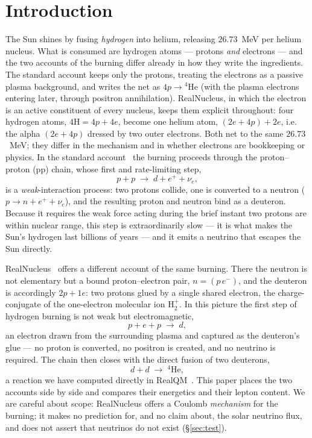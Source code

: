 \documentclass[11pt]{article}
\begin{document}

\section{Introduction}

The Sun shines by fusing \emph{hydrogen} into helium, releasing $26.73$~MeV per helium nucleus. What is
consumed are hydrogen atoms --- protons \emph{and} electrons --- and the two accounts of the burning
differ already in how they write the ingredients. The standard account keeps only the protons, treating
the electrons as a passive plasma background, and writes the net as $4p\to{}^4\mathrm{He}$ (with the
plasma electrons entering later, through positron annihilation). RealNucleus, in which the electron is
an active constituent of every nucleus, keeps them explicit throughout: four hydrogen atoms,
$4\mathrm{H}=4p+4e$, become one helium atom, $(2e+4p)+2e$, i.e. the alpha $(2e+4p)$ dressed by two outer
electrons. Both net to the same $26.73$~MeV; they differ in the mechanism and in whether electrons are
bookkeeping or physics. In the standard account~\cite{Bethe,Adelberger} the burning proceeds through the
proton--proton (pp) chain, whose first and rate-limiting step,
\begin{equation}
p + p \;\longrightarrow\; d + e^{+} + \nu_e ,
\label{eq:pp}
\end{equation}
is a \emph{weak}-interaction process: two protons collide, one is converted to a neutron
($p\to n + e^{+} + \nu_e$), and the resulting proton and neutron bind as a deuteron. Because it
requires the weak force acting during the brief instant two protons are within nuclear range, this
step is extraordinarily slow --- it is what makes the Sun's hydrogen last billions of years --- and it
emits a neutrino that escapes the Sun directly.

RealNucleus~\cite{Johnson-RealNucleus,Johnson-RealQM} offers a different account of the same burning.
There the neutron is not elementary but a bound proton--electron pair, $n=(p\,e^-)$, and the deuteron
is accordingly $2p+1e$: two protons glued by a single shared electron, the charge-conjugate of the
one-electron molecular ion $\mathrm{H}_2^{+}$. In this picture the first step of hydrogen burning is
not weak but electromagnetic,
\begin{equation}
p + e + p \;\longrightarrow\; d ,
\label{eq:pep}
\end{equation}
an electron drawn from the surrounding plasma and captured as the deuteron's glue --- no proton is
converted, no positron is created, and no neutrino is required. The chain then closes with the direct
fusion of two deuterons,
\begin{equation}
d + d \;\longrightarrow\; {}^4\mathrm{He} ,
\label{eq:dd}
\end{equation}
a reaction we have computed directly in RealQM~\cite{Johnson-RealNucleus}. This paper places the two
accounts side by side and compares their energetics and their lepton content. We are careful about
scope: RealNucleus offers a Coulomb \emph{mechanism} for the burning; it makes no prediction for, and
no claim about, the solar neutrino flux, and does not assert that neutrinos do not exist
(\S\ref{sec:test}).
\end{document}
